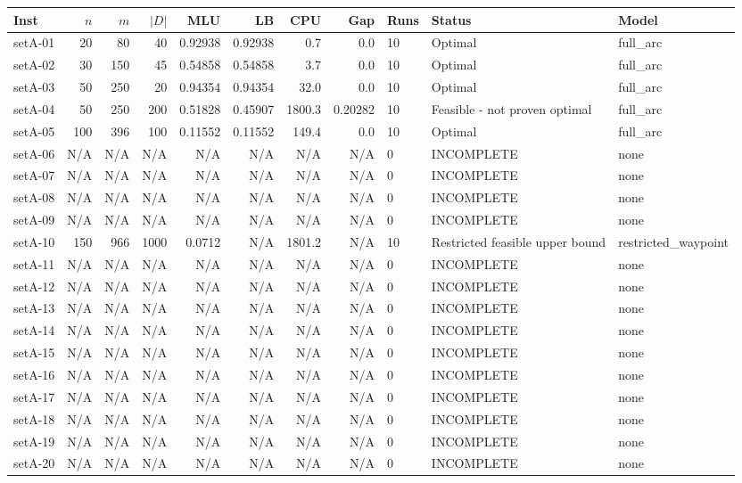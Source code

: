 \begin{tabular}{lrrrrrrrlll}
\toprule
Inst & $n$ & $m$ & $|D|$ & MLU & LB & CPU & Gap & Runs & Status & Model \\ \midrule
setA-01 & 20 & 80 & 40 & 0.92938 & 0.92938 & 0.7 & 0.0 & 10 & Optimal & full\_arc \\
setA-02 & 30 & 150 & 45 & 0.54858 & 0.54858 & 3.7 & 0.0 & 10 & Optimal & full\_arc \\
setA-03 & 50 & 250 & 20 & 0.94354 & 0.94354 & 32.0 & 0.0 & 10 & Optimal & full\_arc \\
setA-04 & 50 & 250 & 200 & 0.51828 & 0.45907 & 1800.3 & 0.20282 & 10 & Feasible - not proven optimal & full\_arc \\
setA-05 & 100 & 396 & 100 & 0.11552 & 0.11552 & 149.4 & 0.0 & 10 & Optimal & full\_arc \\
setA-06 & N/A & N/A & N/A & N/A & N/A & N/A & N/A & 0 & INCOMPLETE & none \\
setA-07 & N/A & N/A & N/A & N/A & N/A & N/A & N/A & 0 & INCOMPLETE & none \\
setA-08 & N/A & N/A & N/A & N/A & N/A & N/A & N/A & 0 & INCOMPLETE & none \\
setA-09 & N/A & N/A & N/A & N/A & N/A & N/A & N/A & 0 & INCOMPLETE & none \\
setA-10 & 150 & 966 & 1000 & 0.0712 & N/A & 1801.2 & N/A & 10 & Restricted feasible upper bound & restricted\_waypoint \\
setA-11 & N/A & N/A & N/A & N/A & N/A & N/A & N/A & 0 & INCOMPLETE & none \\
setA-12 & N/A & N/A & N/A & N/A & N/A & N/A & N/A & 0 & INCOMPLETE & none \\
setA-13 & N/A & N/A & N/A & N/A & N/A & N/A & N/A & 0 & INCOMPLETE & none \\
setA-14 & N/A & N/A & N/A & N/A & N/A & N/A & N/A & 0 & INCOMPLETE & none \\
setA-15 & N/A & N/A & N/A & N/A & N/A & N/A & N/A & 0 & INCOMPLETE & none \\
setA-16 & N/A & N/A & N/A & N/A & N/A & N/A & N/A & 0 & INCOMPLETE & none \\
setA-17 & N/A & N/A & N/A & N/A & N/A & N/A & N/A & 0 & INCOMPLETE & none \\
setA-18 & N/A & N/A & N/A & N/A & N/A & N/A & N/A & 0 & INCOMPLETE & none \\
setA-19 & N/A & N/A & N/A & N/A & N/A & N/A & N/A & 0 & INCOMPLETE & none \\
setA-20 & N/A & N/A & N/A & N/A & N/A & N/A & N/A & 0 & INCOMPLETE & none \\
\bottomrule
\end{tabular}
